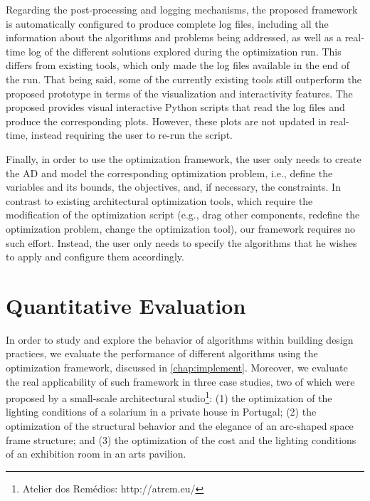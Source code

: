Regarding the post-processing and logging mechanisms, the proposed framework is automatically configured to produce complete log files, including all the information about the algorithms and problems being addressed, as well as a real-time log of the different solutions explored during the optimization run. This differs from existing tools, which only made the log files available in the end of the run. That being said, some of the currently existing tools still outperform the proposed prototype in terms of the visualization and interactivity features. The proposed provides visual interactive Python scripts that read the log files and produce the corresponding plots. However, these plots are not updated in real-time, instead requiring the user to re-run the script.

Finally, in order to use the optimization framework, the user only needs to create the \ac{AD} and model the corresponding optimization problem, i.e., define the variables and its bounds, the objectives, and, if necessary, the constraints. In contrast to existing architectural optimization tools, which require the modification of the optimization script (e.g., drag other components, redefine the optimization problem, change the optimization tool), our framework requires no such effort. Instead, the user only needs to specify the algorithms that he wishes to apply and configure them accordingly.

\section{Quantitative Evaluation}
\label{sec:quantitative}

In order to study and explore the behavior of algorithms within building design practices, we evaluate the performance of different algorithms using the optimization framework, discussed in \cref{chap:implement}. Moreover, we evaluate the real applicability of such framework in three case studies, two of which were proposed by a small-scale architectural studio\footnote{Atelier dos Remédios: http://atrem.eu/}: (1) the optimization of the lighting conditions of a solarium in a private house in Portugal; (2) the optimization of the structural behavior and the elegance of an arc-shaped space frame structure; and (3) the optimization of the cost and the lighting conditions of an exhibition room in an arts pavilion.   

